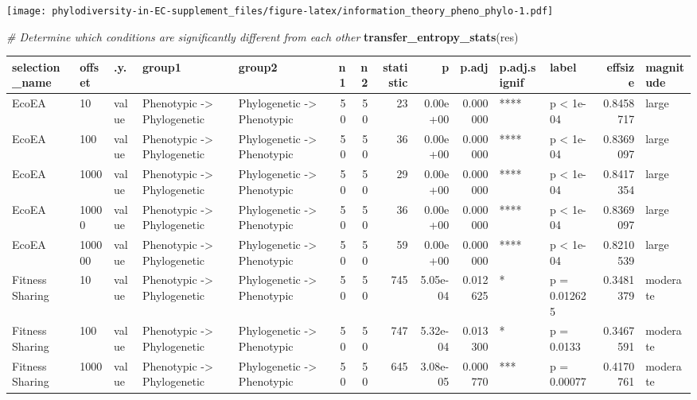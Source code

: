 \documentclass[]{book}
\newenvironment{Shaded}{\begin{snugshade}}{\end{snugshade}}
\newcommand{\CommentTok}[1]{\textcolor[rgb]{0.56,0.35,0.01}{\textit{#1}}}
\newcommand{\KeywordTok}[1]{\textcolor[rgb]{0.13,0.29,0.53}{\textbf{#1}}}
\newcommand{\NormalTok}[1]{#1}
\begin{document}
\texttt{[image: phylodiversity-in-EC-supplement\_files/figure-latex/information\_theory\_pheno\_phylo-1.pdf]}

\begin{Shaded}
\begin{Highlighting}[]
\CommentTok{# Determine which conditions are significantly different from each other}
\KeywordTok{transfer_entropy_stats}\NormalTok{(res)}
\end{Highlighting}
\end{Shaded}

\begin{table}
\centering
\begin{tabular}[t]{l|l|l|l|l|r|r|r|r|r|l|l|r|l}
\hline
selection\_name & offset & .y. & group1 & group2 & n1 & n2 & statistic & p & p.adj & p.adj.signif & label & effsize & magnitude\\
\hline
EcoEA & 10 & value & Phenotypic
    ->
Phylogenetic & Phylogenetic
    ->
Phenotypic & 50 & 50 & 23 & 0.00e+00 & 0.000000 & **** & p < 1e-04 & 0.8458717 & large\\
\hline
EcoEA & 100 & value & Phenotypic
    ->
Phylogenetic & Phylogenetic
    ->
Phenotypic & 50 & 50 & 36 & 0.00e+00 & 0.000000 & **** & p < 1e-04 & 0.8369097 & large\\
\hline
EcoEA & 1000 & value & Phenotypic
    ->
Phylogenetic & Phylogenetic
    ->
Phenotypic & 50 & 50 & 29 & 0.00e+00 & 0.000000 & **** & p < 1e-04 & 0.8417354 & large\\
\hline
EcoEA & 10000 & value & Phenotypic
    ->
Phylogenetic & Phylogenetic
    ->
Phenotypic & 50 & 50 & 36 & 0.00e+00 & 0.000000 & **** & p < 1e-04 & 0.8369097 & large\\
\hline
EcoEA & 100000 & value & Phenotypic
    ->
Phylogenetic & Phylogenetic
    ->
Phenotypic & 50 & 50 & 59 & 0.00e+00 & 0.000000 & **** & p < 1e-04 & 0.8210539 & large\\
\hline
Fitness Sharing & 10 & value & Phenotypic
    ->
Phylogenetic & Phylogenetic
    ->
Phenotypic & 50 & 50 & 745 & 5.05e-04 & 0.012625 & * & p = 0.012625 & 0.3481379 & moderate\\
\hline
Fitness Sharing & 100 & value & Phenotypic
    ->
Phylogenetic & Phylogenetic
    ->
Phenotypic & 50 & 50 & 747 & 5.32e-04 & 0.013300 & * & p = 0.0133 & 0.3467591 & moderate\\
\hline
Fitness Sharing & 1000 & value & Phenotypic
    ->
Phylogenetic & Phylogenetic
    ->
Phenotypic & 50 & 50 & 645 & 3.08e-05 & 0.000770 & *** & p = 0.00077 & 0.4170761 & moderate\\

\end{tabular}
\end{table}
\end{document}
